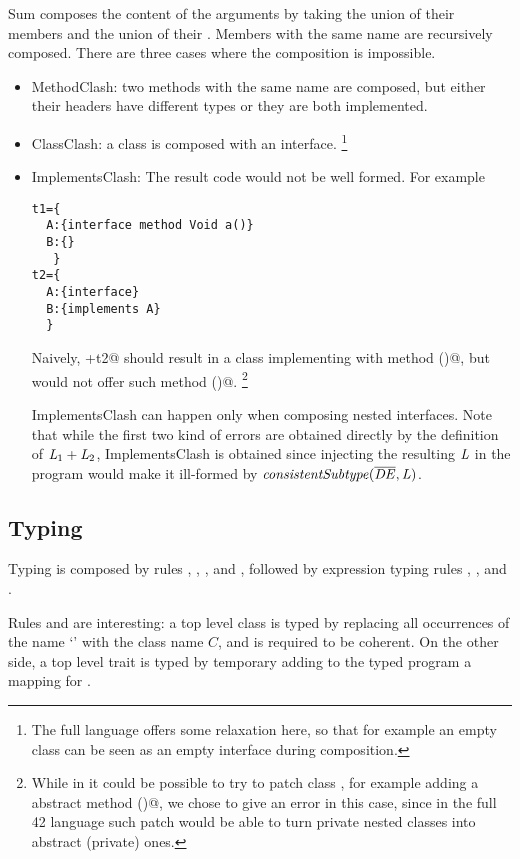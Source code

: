 Sum composes the content of the arguments
by taking the union of their members and the union of their \Q@implements@.
Members with the same name are recursively composed.
There are three cases where the composition is impossible.
\begin{itemize}
\item MethodClash: two methods with the same name are composed,
but either their headers have different types or they are both implemented.
\item ClassClash: a class is composed with an interface.%
\footnote{
The full language offers some relaxation here, so that for example an empty class can be seen as an empty interface during composition.
}
\item ImplementsClash:
The result code would not be well formed.
For example
\begin{lstlisting}
t1={
  A:{interface method Void a()}
  B:{}
   }
t2={
  A:{interface}
  B:{implements A}
  }
\end{lstlisting}
Naively, +t2@ should result in a class \Q@B@ implementing \Q@A@ with method \Q@a()@,
but \Q@B@ would not offer such method \Q@a()@.%
\footnote{While in \name it could be possible to try to patch class \Q@B@, for example adding a
abstract method \Q@a()@, we chose to give an error in this case, since in the full 42 language
such patch would 
be able to turn private nested classes
into abstract (private) ones.}

ImplementsClash can happen only when composing nested interfaces. Note that while the first two kind of errors are obtained directly by the definition of 
$\mathit{L}_1+\mathit{L}_2$, ImplementsClash is obtained since injecting the resulting 
$\mathit{L}$ in the program would make it ill-formed by 
$\mathit{consistentSubtype}(\overline{\mathit{DE}},\mathit{L})$.
\end{itemize}

\subsection{Typing}
Typing is composed by rules , ,
,
 and ,
followed by expression typing rules
, ,  and .

Rules  and 
are interesting: a top level class is typed by replacing all occurrences of the name `\Q@This@' with the class name $C$,
and is required to be coherent.
On the other side, a top level trait is typed by temporary adding to the typed program a mapping for
\Q@This@.

